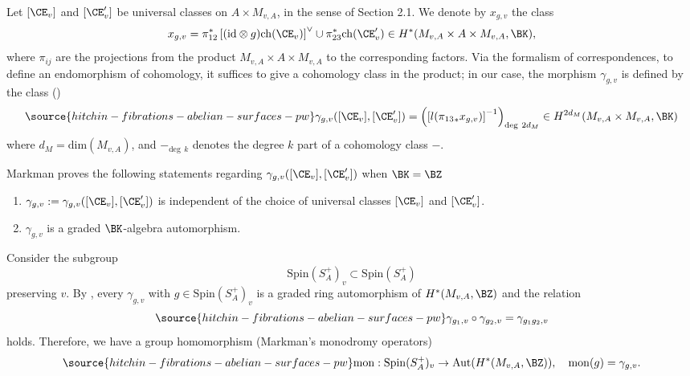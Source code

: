 Let $[\CE_v]$ and $[\CE'_v]$ be universal classes on $A \times M_{v,A}$, in the sense of Section 2.1. We denote by $x_{g,v}$ the class
\[
x_{g,v} =  \pi_{12}^\ast \left[(\mathrm{id}\otimes g)\mathrm{ch}(\CE_v)\right]^\vee \cup \pi_{23}^\ast \mathrm{ch}(\CE'_v) \in H^*(M_{v,A} \times A \times M_{v,A} ,\BK),
\]
where $\pi_{ij}$ are the projections from the product $M_{v,A}\times A \times M_{v,A}$ to the corresponding factors.
Via the formalism of correspondences, to define an endomorphism of cohomology, it suffices to give a cohomology class in the product; in our case,
the morphism $\gamma_{g,v}$ is defined by the class ()
\begin{equation}\label{gammagv}
\source{hitchin-fibrations-abelian-surfaces-pw}
 \gamma_{g,v}([\CE_v],[\CE'_v])=\left( \left[l({\pi_{13}}_\ast x_{g,v}) \right]^{-1} \right)_{\mathrm{deg}~2d_M} \in H^{2d_M}(M_{v,A} \times M_{v,A}, \BK)
\end{equation}
where $d_M = \mathrm{dim} (M_{v,A})$, and $-_{\mathrm{deg}~~ k}$ denotes the degree $k$ part of a cohomology class $-$.

Markman proves the following statements regarding $\gamma_{g,v}([\CE_v],[\CE'_v])$ when $\BK = \BZ$

\begin{enumerate}
\item[(a)] $\gamma_{g,v}:= \gamma_{g,v}([\CE_v],[\CE'_v])$ is independent of the choice of universal classes $[\CE_v]$ and $[\CE'_v]$.
\item[(b)] $\gamma_{g,v}$ is a graded $\BK$-algebra automorphism.
\end{enumerate}

Consider the subgroup
\[
\mathrm{Spin}(S_A^+)_v \subset \mathrm{Spin}(S_A^+)
\]
preserving $v$. By \cite[Corollary 8.4]{Markman3}, every $\gamma_{g,v}$ with $g\in \mathrm{Spin}(S_A^+)_v$ is a graded ring automorphism of $H^\ast(M_{v,A}, \BZ)$ and the relation
\begin{equation}\label{composition}
\source{hitchin-fibrations-abelian-surfaces-pw}
\gamma_{g_1,v}\circ \gamma_{g_2,v} = \gamma_{g_1g_2,v}
\end{equation}
holds. Therefore, we have a group homomorphism (Markman's monodromy operators)
\begin{equation}\label{mon2}
\source{hitchin-fibrations-abelian-surfaces-pw}
    \mathrm{mon}:  \mathrm{Spin}(S_A^+)_v \to \mathrm{Aut}(H^*(M_{v,A}, \BZ)),\quad \mathrm{mon}(g) = \gamma_{g,v}.
\end{equation}


